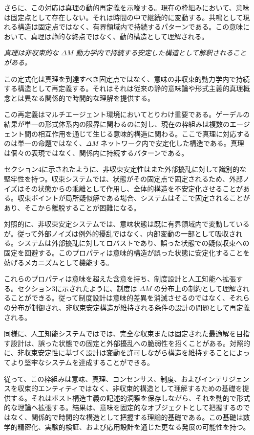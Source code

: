 \documentclass[11pt,a4paper]{article}
\theoremstyle{definition}
\begin{document}
さらに、この対応は真理の動的再定義を示唆する。現在の枠組みにおいて、意味は固定点として存在しない。それは時間の中で継続的に変動する。共鳴として現れる構造は固定点ではなく、有界領域内で持続するパターンである。この意味において、真理は静的な終点ではなく、動的構造として理解される。

\textit{真理は非収束的な $\Delta M$ 動力学内で持続する安定した構造として解釈されることがある。}

この定式化は真理を到達すべき固定点ではなく、意味の非収束的動力学内で持続する構造として再定義する。それはそれは従来の静的意味論や形式主義的真理概念とは異なる関係的で時間的な理解を提供する。

この再定義はマルチエージェント環境においてとりわけ重要である。ゲーデルの結果が単一の形式体系内の限界に関わるのに対し、現在の枠組みは複数のエージェント間の相互作用を通じて生じる意味的構造に関わる。ここで真理に対応するのは単一の命題ではなく、$\Delta M$ ネットワーク内で安定化した構造である。真理は個々の表現ではなく、関係内に持続するパターンである。

セクション4に示されたように、非収束安定性はまた外部擾乱に対して識別的な堅牢性を持つ。収束システムでは、状態がその固定点で固定されるため、外部ノイズはその状態からの乖離として作用し、全体的構造を不安定化させることがある。収束ポイントが局所疑似解である場合、システムはそこで固定されることがあり、そこから離脱することが困難になる。

対照的に、非収束安定システムでは、意味状態は既に有界領域内で変動しているが。従って外部ノイズは例外的擾乱ではなく、内部変動の一部として吸収される。システムは外部擾乱に対してロバストであり、誤った状態での疑似収束への固定を回避する。このプロパティは意味的構造が誤った状態に安定化することを妨げるメカニズムとして機能する。

これらのプロパティは意味を超えた含意を持ち、制度設計と人工知能へ拡張する。セクション3に示されたように、制度は $\Delta M$ の分布上の制約として理解されることができる。従って制度設計は意味的差異を消滅させるのではなく、それらの分布が制御され、非収束安定構造が維持される条件の設計の問題として再定義される。

同様に、人工知能システムではでは、完全な収束または固定された最適解を目指す設計は、誤った状態での固定と外部擾乱への脆弱性を招くことがある。対照的に、非収束安定性に基づく設計は変動を許可しながら構造を維持することによってより堅牢なシステムを達成することができる。

従って、この枠組みは意味、真理、コンセンサス、制度、およびインテリジェンスを収束的エンティティではなく、非収束的構造として理解するための基礎を提供する。それはポスト構造主義の記述的洞察を保存しながら、それを動的で形式的な理論へ拡張する。結果は、意味を固定的なオブジェクトとして把握するのではなく、関係的で時間的な構造として把握する理論的基礎である。この基礎は数学的精密化、実験的検証、および応用設計を通じた更なる発展の可能性を持つ。
\end{document}
